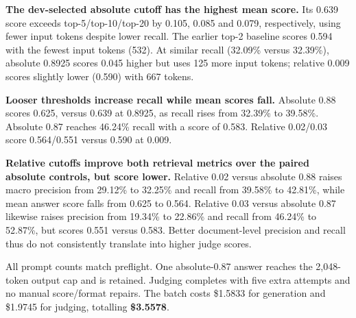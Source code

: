 \textbf{The dev-selected absolute cutoff has the highest mean score.} Its 0.639 score exceeds top-5/top-10/top-20 by 0.105, 0.085 and 0.079, respectively, using fewer input tokens despite lower recall. The earlier top-2 baseline scores 0.594 with the fewest input tokens (532). At similar recall (32.09\% versus 32.39\%), absolute 0.8925 scores 0.045 higher but uses 125 more input tokens; relative 0.009 scores slightly lower (0.590) with 667 tokens.

\textbf{Looser thresholds increase recall while mean scores fall.} Absolute 0.88 scores 0.625, versus 0.639 at 0.8925, as recall rises from 32.39\% to 39.58\%. Absolute 0.87 reaches 46.24\% recall with a score of 0.583. Relative 0.02/0.03 score 0.564/0.551 versus 0.590 at 0.009.

\textbf{Relative cutoffs improve both retrieval metrics over the paired absolute controls, but score lower.} Relative 0.02 versus absolute 0.88 raises macro precision from 29.12\% to 32.25\% and recall from 39.58\% to 42.81\%, while mean answer score falls from 0.625 to 0.564. Relative 0.03 versus absolute 0.87 likewise raises precision from 19.34\% to 22.86\% and recall from 46.24\% to 52.87\%, but scores 0.551 versus 0.583. Better document-level precision and recall thus do not consistently translate into higher judge scores.

All prompt counts match preflight. One absolute-0.87 answer reaches the 2,048-token output cap and is retained. Judging completes with five extra attempts and no manual score/format repairs. The batch costs \$1.5833 for generation and \$1.9745 for judging, totalling \textbf{\$3.5578}.
